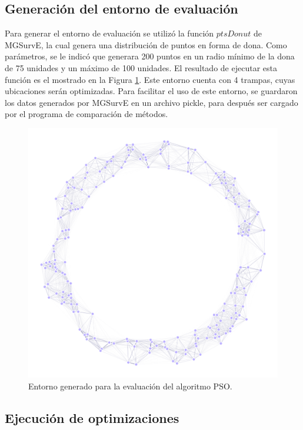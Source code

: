 \documentclass[letterpaper]{report}
\begin{document}
    \subsection{Generación del entorno de evaluación}
 
    Para generar el entorno de evaluación se utilizó la función $ptsDonut$ de
    MGSurvE, la cual genera una distribución de puntos en forma de dona. Como
    parámetros, se le indicó que generara 200 puntos en un radio mínimo de la
    dona de 75 unidades y un máximo de 100 unidades. El resultado de ejecutar
    esta función es el mostrado en la Figura \ref{fig:evaluation-env}. Este
    entorno cuenta con 4 trampas, cuyas ubicaciones serán optimizadas. Para
    facilitar el uso de este entorno, se guardaron los datos generados por
    MGSurvE en un archivo pickle, para después ser cargado por el programa de
    comparación de métodos. 

    \begin{figure}[ht!]
      \centering
      \includegraphics[width=\textwidth]{eval-env.png}
      \caption{Entorno generado para la evaluación del algoritmo PSO.}
      \label{fig:evaluation-env}
    \end{figure}

    \subsection{Ejecución de optimizaciones}
\end{document}
